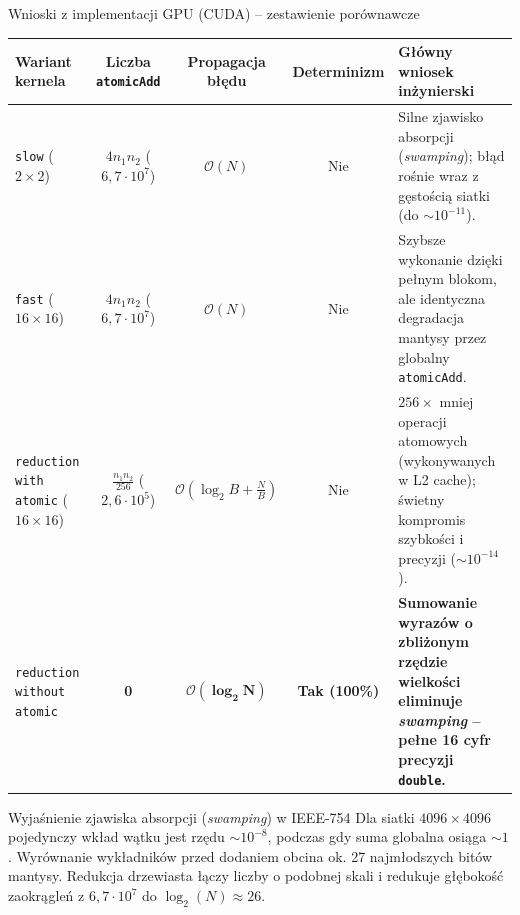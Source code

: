 \documentclass[aspectratio=169, 10pt, xcolor={table}]{beamer}
\begin{document}
\begin{frame}{Wnioski z implementacji GPU (CUDA) -- zestawienie porównawcze}
  \begin{table}
    \centering
    \footnotesize
    \begin{tabular}{@{} p{2.7cm} c c c p{4.6cm} @{}}
      \toprule
      \textbf{Wariant kernela} & \textbf{Liczba \texttt{atomicAdd}} & \textbf{Propagacja błędu} & \textbf{Determinizm} & \textbf{Główny wniosek inżynierski} \\
      \midrule
      \texttt{slow} ($2\times 2$) & $4 n_1 n_2$ ($6{,}7 \cdot 10^7$) & $\mathcal{O}(N)$ & Nie & Silne zjawisko absorpcji (\textit{swamping}); błąd rośnie wraz z gęstością siatki (do $\sim 10^{-11}$). \\
      \midrule
      \texttt{fast} ($16\times 16$) & $4 n_1 n_2$ ($6{,}7 \cdot 10^7$) & $\mathcal{O}(N)$ & Nie & Szybsze wykonanie dzięki pełnym blokom, ale identyczna degradacja mantysy przez globalny \texttt{atomicAdd}. \\
      \midrule
      \texttt{reduction with atomic} ($16\times 16$) & $\frac{n_1 n_2}{256}$ ($2{,}6 \cdot 10^5$) & $\mathcal{O}(\log_2 B + \frac{N}{B})$ & Nie & $256\times$ mniej operacji atomowych (wykonywanych w L2 cache); świetny kompromis szybkości i precyzji ($\sim 10^{-14}$). \\
      \midrule
      \rowcolor{RowHighlight}
      \texttt{reduction without atomic} & \textbf{0} & $\mathbf{\mathcal{O}(\log_2 N)}$ & \textbf{Tak (100\%)} & \textbf{Sumowanie wyrazów o zbliżonym rzędzie wielkości eliminuje \textit{swamping} -- pełne 16 cyfr precyzji \texttt{double}.} \\
      \bottomrule
    \end{tabular}
  \end{table}

  \vspace{0.15cm}
  \begin{block}{Wyjaśnienie zjawiska absorpcji (\textit{swamping}) w IEEE-754}
    Dla siatki $4096 \times 4096$ pojedynczy wkład wątku jest rzędu $\sim 10^{-8}$, podczas gdy suma globalna osiąga $\sim 1$. Wyrównanie wykładników przed dodaniem obcina ok. 27 najmłodszych bitów mantysy. Redukcja drzewiasta łączy liczby o podobnej skali i redukuje głębokość zaokrągleń z $6{,}7 \cdot 10^7$ do $\log_2(N) \approx 26$.
  \end{block}
\end{frame}
\end{document}
